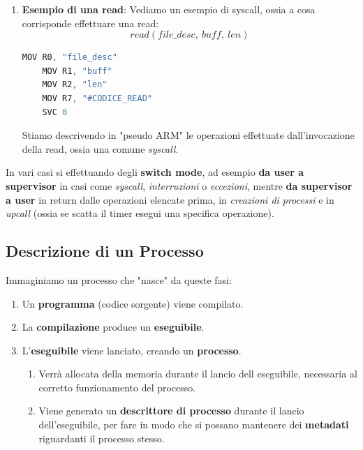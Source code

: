 \documentclass{article}
\begin{document}
\begin{enumerate}
\begin{enumerate}
    \item \textbf{Esempio di una read}: Vediamo un esempio di syscall, ossia a cosa corrisponde effettuare una read:
    \vspace*{5px}
    \[ \boxed{read(file\_desc,\:buff,\:len)} \]
    \vspace*{5px}
\begin{lstlisting}[language = JavaScript]
    MOV R0, "file_desc"
    MOV R1, "buff"
    MOV R2, "len"
    MOV R7, "#CODICE_READ"
    SVC 0
\end{lstlisting}

Stiamo descrivendo in "pseudo ARM" le operazioni effettuate dall'invocazione della read, ossia una comune \textit{syscall}.

\end{enumerate}

In vari casi si effettuando degli \textbf{switch mode}, ad esempio \textbf{da user a supervisor} in casi come \textit{syscall}, \textit{interruzioni} o \textit{eccezioni}, mentre \textbf{da supervisor a user} in return dalle operazioni elencate prima, in \textit{creazioni di processi} e in \textit{upcall} (ossia se scatta il timer esegui una specifica operazione).

\end{enumerate}

\newpage

\subsection{Descrizione di un Processo}

Immaginiamo un processo che "nasce" da queste fasi:

\begin{enumerate}
    \item Un \textbf{programma} (codice sorgente) viene compilato.
    \item La \textbf{compilazione} produce un \textbf{eseguibile}.
    \item L'\textbf{eseguibile} viene lanciato, creando un \textbf{processo}.
    \begin{enumerate}
        \item Verrà allocata della memoria durante il lancio dell eseguibile, necessaria al corretto funzionamento del processo.
        \item Viene generato un \textbf{descrittore di processo} durante il lancio dell'eseguibile, per fare in modo che si possano mantenere dei \textbf{metadati} riguardanti il processo stesso.
    \end{enumerate}
    
\end{enumerate}
\end{document}
